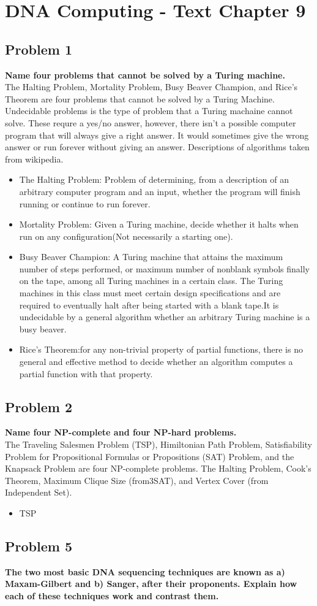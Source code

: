 
\chapter{DNA Computing - Text Chapter 9}


\section{ Problem 1 }
\textbf{ Name four problems that cannot be solved by a Turing machine. } \\
The Halting Problem, Mortality Problem, Busy Beaver Champion, and Rice's Theorem are four problems that cannot be solved by a Turing Machine. Undecidable problems is the type of problem that a Turing machaine cannot solve. These requre a yes/no answer, however, there isn't a possible computer program that will always give a right answer. It would sometimes give the wrong answer or run forever without giving an answer. Descriptions of algorithms taken from wikipedia.
\begin{itemize}
	\item The Halting Problem: Problem of determining, from a description of an arbitrary computer program and an input, whether the program will finish running or continue to run forever.
	\item Mortality Problem: Given a Turing machine, decide whether it halts when run on any configuration(Not necessarily a starting one).
	\item Busy Beaver Champion: A Turing machine that attains the maximum number of steps performed, or maximum number of nonblank symbols finally on the tape, among all Turing machines in a certain class. The Turing machines in this class must meet certain design specifications and are required to eventually halt after being started with a blank tape.It is undecidable by a general algorithm whether an arbitrary Turing machine is a busy beaver.
	\item Rice's Theorem:for any non-trivial property of partial functions, there is no general and effective method to decide whether an algorithm computes a partial function with that property.
\end{itemize}

\section{ Problem 2 }
\textbf{ Name four NP-complete and four NP-hard problems. } \\
The Traveling Salesmen Problem (TSP), Himiltonian Path Problem, Satisfiability Problem for Propositional Formulas or Propositions (SAT) Problem, and the Knapsack Problem are four NP-complete problems. The Halting Problem, Cook's Theorem, Maximum Clique Size (from3SAT), and Vertex Cover (from Independent Set).
\begin{itemize}
	\item TSP
\end{itemize}

\section{ Problem 5 }
\textbf{ The two most basic DNA sequencing techniques are known as a) Maxam-Gilbert and b) Sanger, after their proponents. Explain how each of these techniques work and contrast them. }

